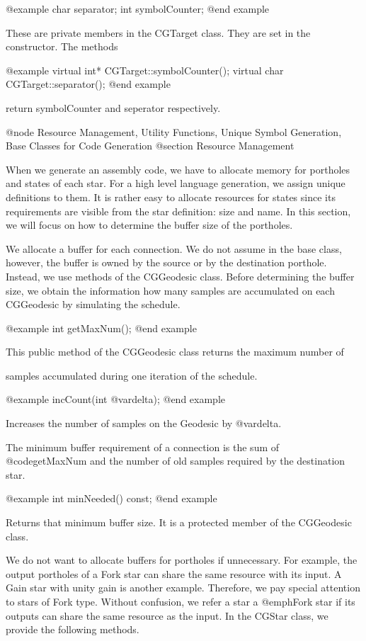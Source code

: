 @example
char separator;
int symbolCounter;
@end example

These are private members in the CGTarget class. They are set in the
constructor. The methods

@example
virtual int* CGTarget::symbolCounter();
virtual char CGTarget::separator();
@end example

return symbolCounter and seperator respectively.

@node Resource Management, Utility Functions, Unique Symbol Generation, Base Classes for Code Generation
@section Resource Management

When we generate an assembly code, we have to allocate memory for portholes
and states of each star. For a high level language generation, we assign
unique definitions to them. It is rather easy to allocate resources for states
since its requirements are visible from the star definition: size and
name. In this section, we will focus on how to determine the buffer 
size of the portholes.

We allocate a buffer for each connection. We do not assume in the base class,
however, the buffer is owned by the source or by the destination porthole.
Instead, we use methods of the CGGeodesic class. Before determining the buffer
size, we obtain the information how many samples are accumulated on each
CGGeodesic by simulating the schedule. 

@example
int getMaxNum();
@end example

This public method of the CGGeodesic class returns the maximum number of

samples accumulated during one iteration of the schedule.

@example
incCount(int @var{delta});
@end example

Increases the number of samples on the Geodesic by @var{delta}.

The minimum buffer requirement of a connection is the sum of 
@code{getMaxNum} and the number of old samples required
by the destination star.

@example
int minNeeded() const;
@end example

Returns that minimum buffer size. It is a protected member of the CGGeodesic
class. 

We do not want to allocate buffers for portholes if unnecessary. For example,
the output portholes of a Fork star can share the same resource with its
input. A Gain star with unity gain is another example. Therefore, we pay
special attention to stars of Fork type. Without confusion, we refer
a star a @emph{Fork} star if its outputs can share the same resource as
the input. In the CGStar class, we provide the following methods.

